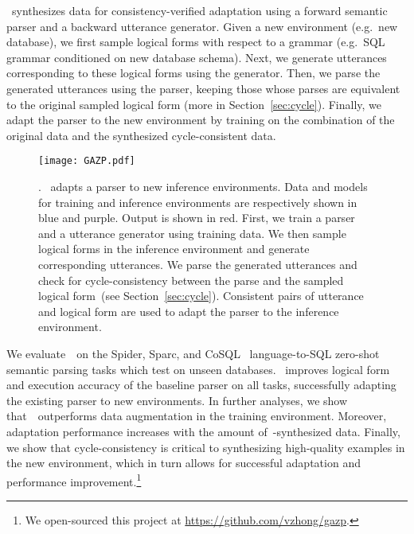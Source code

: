 \documentclass[11pt,a4paper]{article}
\begin{document}
\modelnameshort~synthesizes data for consistency-verified adaptation using a forward semantic parser and a backward utterance generator.
Given a new environment (e.g.~new database), we first sample logical forms with respect to a grammar (e.g.~SQL grammar conditioned on new database schema).
Next, we generate utterances corresponding to these logical forms using the generator.
Then, we parse the generated utterances using the parser, keeping those whose parses are equivalent to the original sampled logical form (more in Section~\ref{sec:cycle}).
Finally, we adapt the parser to the new environment by training on the combination of the original data and the synthesized cycle-consistent data.


\begin{figure*}[t]
    \centering
    \texttt{[image: GAZP.pdf]}
    \caption{
    \papertitle.
    \modelnameshort~adapts a parser to new inference environments.
    Data and models for training and inference environments are respectively shown in blue and purple.
    Output is shown in red.
    First, we train a parser and a utterance generator using training data.
    We then sample logical forms in the inference environment and generate corresponding utterances.
    We parse the generated utterances and check for cycle-consistency between the parse and the sampled logical form~(see Section~\ref{sec:cycle}).
    Consistent pairs of utterance and logical form are used to adapt the parser to the inference environment.
    }
    \label{fig:main}
    \vspace{-0.15in}
\end{figure*}



We evaluate~\modelnameshort~on the Spider, Sparc, and CoSQL~\citep{yu2018spider,yu2019cosql,yu2019sparc} language-to-SQL zero-shot semantic parsing tasks which test on unseen databases.
\modelnameshort~improves logical form and execution accuracy of the baseline parser on all tasks, successfully adapting the existing parser to new environments.
In further analyses, we show that~\modelnameshort~outperforms data augmentation in the training environment.
Moreover, adaptation performance increases with the amount of~\modelnameshort-synthesized data.
Finally, we show that cycle-consistency is critical to synthesizing high-quality examples in the new environment, which in turn allows for successful adaptation and performance improvement.\footnote{We open-sourced this project at \url{https://github.com/vzhong/gazp}.}
\end{document}
